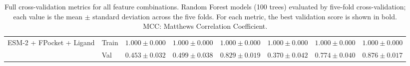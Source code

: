 \begin{table}[h!]
{\begin{tabular}{llcccccc}
\hline
\multirow{2}{*}{ESM-2 + FPocket + Ligand} & Train & $1.000 \pm 0.000$ & $1.000 \pm 0.000$ & $1.000 \pm 0.000$ & $1.000 \pm 0.000$ & $1.000 \pm 0.000$ & $1.000 \pm 0.000$ \\
 & Val & $\mathbf{0.453 \pm 0.032}$ & $\mathbf{0.499 \pm 0.038}$ & $0.829 \pm 0.019$ & $0.370 \pm 0.042$ & $0.774 \pm 0.040$ & $\mathbf{0.876 \pm 0.017}$ \\
\hline
\end{tabular}%
}
\caption{Full cross-validation metrics for all feature combinations. Random Forest models (100 trees) evaluated by five-fold cross-validation; each value is the mean $\pm$ standard deviation across the five folds. For each metric, the best validation score is shown in bold. MCC: Matthews Correlation Coefficient.}\label{tab:supp_metrics}
\end{table}
